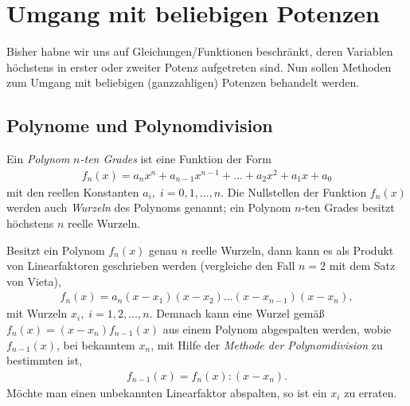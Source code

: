 \section{Umgang mit beliebigen Potenzen}

Bisher habne wir uns auf Gleichungen/Funktionen beschränkt, deren Variablen höchstens in erster oder zweiter Potenz aufgetreten sind. Nun sollen Methoden zum Umgang mit beliebigen (ganzzahligen) Potenzen behandelt werden. 

\subsection{Polynome und Polynomdivision}

Ein \emph{Polynom} $n$\emph{-ten Grades} ist eine Funktion der Form 
\begin{align}
    f_n(x) = a_n x^n + a_{n-1} x^{n-1} + \hdots + a_2 x^2 + a_1 x + a_0
\end{align}
mit den reellen Konstanten $a_i,\; i = 0,1,\hdots,n$. Die Nullstellen der Funktion $f_n(x)$ werden auch \emph{Wurzeln} des Polynoms genannt; ein Polynom $n$-ten Grades besitzt höchstens $n$ reelle Wurzeln. 

Besitzt ein Polynom $f_n(x)$ genau $n$ reelle Wurzeln, dann kann es als Produkt von Linearfaktoren geschrieben werden (vergleiche den Fall $n=2$ mit dem Satz von Vieta), 
\begin{align}
    f_n(x) = a_n (x-x_1)(x-x_2)\hdots (x-x_{n-1})(x-x_n),
\end{align}
mit Wurzeln $x_i, \; i=1,2,\hdots,n$. Demnach kann eine Wurzel gemäß $f_n(x) = (x-x_n)f_{n-1}(x)$ aus einem Polynom abgespalten werden, wobie $f_{n-1}(x)$, bei bekanntem $x_n$, mit Hilfe der \emph{Methode der Polynomdivision} zu bestimmten ist,
\begin{align}
    f_{n-1}(x) = f_n(x) : (x-x_n).
\end{align}
Möchte man einen unbekannten Linearfaktor abspalten, so ist ein $x_i$ zu erraten.

